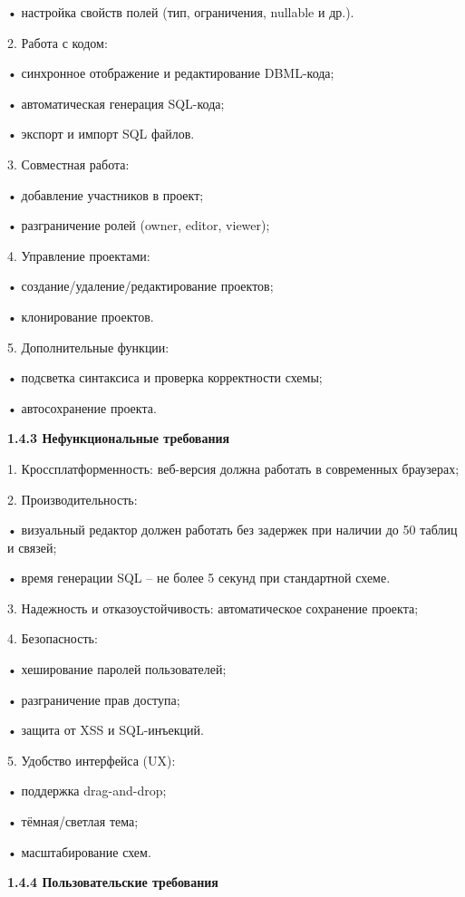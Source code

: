 	•	настройка свойств полей (тип, ограничения, nullable и др.).
    
	2.	Работа с кодом:
    
	•	синхронное отображение и редактирование DBML-кода;
    
	•	автоматическая генерация SQL-кода;
    
	•	экспорт и импорт SQL файлов.
    
	3.	Совместная работа:
    
	•	добавление участников в проект;
    
	•	разграничение ролей (owner, editor, viewer);
    
	4.	Управление проектами:
    
	•	создание/удаление/редактирование проектов;
    
	•	клонирование проектов.
    
	5.	Дополнительные функции:
    
	•	подсветка синтаксиса и проверка корректности схемы;
    
	•	автосохранение проекта.
    

\textbf{\large 1.4.3 Нефункциональные требования }

	1.	Кроссплатформенность: веб-версия должна работать в современных браузерах;
        
	2.	Производительность:
    
	•	визуальный редактор должен работать без задержек при наличии до 50 таблиц и связей;
    
	•	время генерации SQL – не более 5 секунд при стандартной схеме.
    
	3.	Надежность и отказоустойчивость: автоматическое сохранение проекта;
    
	4.	Безопасность:
    
	•	хеширование паролей пользователей;
    
	•	разграничение прав доступа;
    
	•	защита от XSS и SQL-инъекций.
    
	5.	Удобство интерфейса (UX):
    
	•	поддержка drag-and-drop;
    
	•	тёмная/светлая тема;
    
	•	масштабирование схем.

\textbf{\large 1.4.4 Пользовательские требования }

